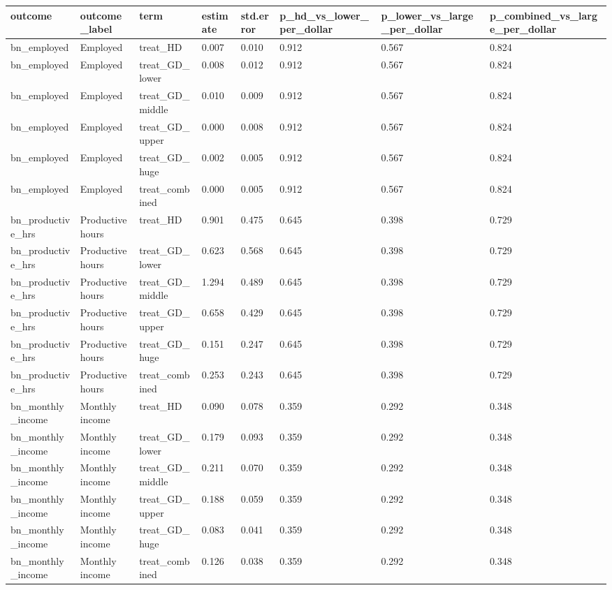 \begin{tabular}{llllllll}
\toprule
outcome & outcome\_label & term & estimate & std.error & p\_hd\_vs\_lower\_per\_dollar & p\_lower\_vs\_large\_per\_dollar & p\_combined\_vs\_large\_per\_dollar
 \\
\midrule
bn\_employed & Employed & treat\_HD & 0.007 & 0.010 & 0.912 & 0.567 & 0.824 \\
bn\_employed & Employed & treat\_GD\_lower & 0.008 & 0.012 & 0.912 & 0.567 & 0.824 \\
bn\_employed & Employed & treat\_GD\_middle & 0.010 & 0.009 & 0.912 & 0.567 & 0.824 \\
bn\_employed & Employed & treat\_GD\_upper & 0.000 & 0.008 & 0.912 & 0.567 & 0.824 \\
bn\_employed & Employed & treat\_GD\_huge & 0.002 & 0.005 & 0.912 & 0.567 & 0.824 \\
bn\_employed & Employed & treat\_combined & 0.000 & 0.005 & 0.912 & 0.567 & 0.824 \\
bn\_productive\_hrs & Productive hours & treat\_HD & 0.901 & 0.475 & 0.645 & 0.398 & 0.729 \\
bn\_productive\_hrs & Productive hours & treat\_GD\_lower & 0.623 & 0.568 & 0.645 & 0.398 & 0.729 \\
bn\_productive\_hrs & Productive hours & treat\_GD\_middle & 1.294 & 0.489 & 0.645 & 0.398 & 0.729 \\
bn\_productive\_hrs & Productive hours & treat\_GD\_upper & 0.658 & 0.429 & 0.645 & 0.398 & 0.729 \\
bn\_productive\_hrs & Productive hours & treat\_GD\_huge & 0.151 & 0.247 & 0.645 & 0.398 & 0.729 \\
bn\_productive\_hrs & Productive hours & treat\_combined & 0.253 & 0.243 & 0.645 & 0.398 & 0.729 \\
bn\_monthly\_income & Monthly income & treat\_HD & 0.090 & 0.078 & 0.359 & 0.292 & 0.348 \\
bn\_monthly\_income & Monthly income & treat\_GD\_lower & 0.179 & 0.093 & 0.359 & 0.292 & 0.348 \\
bn\_monthly\_income & Monthly income & treat\_GD\_middle & 0.211 & 0.070 & 0.359 & 0.292 & 0.348 \\
bn\_monthly\_income & Monthly income & treat\_GD\_upper & 0.188 & 0.059 & 0.359 & 0.292 & 0.348 \\
bn\_monthly\_income & Monthly income & treat\_GD\_huge & 0.083 & 0.041 & 0.359 & 0.292 & 0.348 \\
bn\_monthly\_income & Monthly income & treat\_combined & 0.126 & 0.038 & 0.359 & 0.292 & 0.348 \\

\end{tabular}
